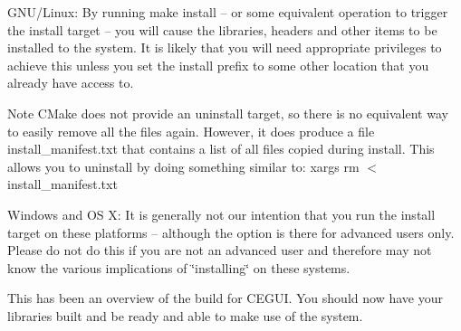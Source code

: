 \begin{DoxyItemize}
\item G\+N\+U/\+Linux\+: By running {\ttfamily make install} – or some equivalent operation to trigger the install target – you will cause the libraries, headers and other items to be installed to the system. It is likely that you will need appropriate privileges to achieve this unless you set the install prefix to some other location that you already have access to. \begin{DoxyNote}{Note}
C\+Make does not provide an uninstall target, so there is no equivalent way to easily remove all the files again. However, it does produce a file {\ttfamily install\+\_\+manifest.\+txt} that contains a list of all files copied during install. This allows you to uninstall by doing something similar to\+: {\ttfamily xargs rm $<$install\+\_\+manifest.\+txt}
\end{DoxyNote}

\item Windows and OS X\+: It is generally not our intention that you run the install target on these platforms – although the option is there for advanced users only. Please do not do this if you are not an advanced user and therefore may not know the various implications of \char`\"{}installing\char`\"{} on these systems.
\end{DoxyItemize}

This has been an overview of the build for C\+E\+G\+UI. You should now have your libraries built and be ready and able to make use of the system. 